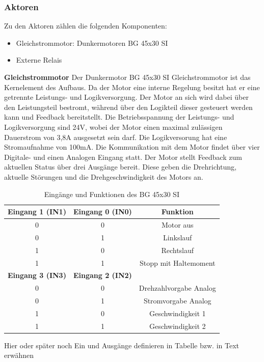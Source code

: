 \subsubsection{Aktoren}
Zu den Aktoren zählen die folgenden Komponenten:
\begin{itemize}
	\item Gleichstrommotor: Dunkermotoren BG 45x30 SI
	\item Externe Relais
\end{itemize}

\noindent\textbf{Gleichstrommotor}\newline
Der Dunkermotor BG 45x30 SI Gleichstrommotor ist das Kernelement des Aufbaus. Da der Motor eine interne Regelung besitzt hat er eine getrennte Leistungs- und Logikversorgung. Der Motor an sich wird dabei über den Leistungsteil bestromt, während über den Logikteil dieser gesteuert werden kann und Feedback bereitstellt. Die Betriebsspannung der Leistungs- und Logikversorgung sind 24V, wobei der Motor einen maximal zulässigen Dauerstrom von 3,8A ausgesetzt sein darf. Die Logikversorung hat eine Stromaufnahme von 100mA. Die Kommunikation mit dem Motor findet über vier Digitale- und einen Analogen Eingang statt. Der Motor stellt Feedback zum aktuellen Status über drei Ausgänge bereit. Diese geben die Drehrichtung, aktuelle Störungen und die Drehgeschwindigkeit des Motors an.\\
\begin{table}[H]
	\centering
		\begin{tabular}{|c|c|c|}
			\hline
			\textbf{Eingang 1 (IN1)} & \textbf{Eingang 0 (IN0)} & \textbf{Funktion}      \\ \hline
			0                        & 0                        & Motor aus              \\ \hline
			0                        & 1                        & Linkslauf              \\ \hline
			1                        & 0                        & Rechtslauf             \\ \hline
			1                        & 1                        & Stopp mit Haltemoment  \\ \hline
			\textbf{Eingang 3 (IN3)} & \textbf{Eingang 2 (IN2)} &                        \\ \hline
			0                        & 0                        & Drehzahlvorgabe Analog \\ \hline
			0                        & 1                        & Stromvorgabe Analog    \\ \hline
			1                        & 0                        & Geschwindigkeit 1      \\ \hline
			1                        & 1                        & Geschwindigkeit 2      \\ \hline
		\end{tabular}%
	\caption{Eingänge und Funktionen des BG 45x30 SI}
	\label{tab:digitale_Eingaenge}
\end{table}
Hier oder später noch Ein und Ausgänge definieren in Tabelle bzw. in Text erwähnen
\\

